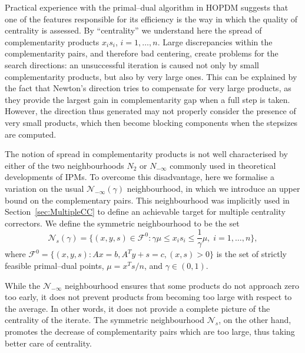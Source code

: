 
Practical experience with the primal--dual algorithm in HOPDM \cite{HOPDM}
suggests that one of the features responsible 
for its efficiency is the way in which the quality of centrality 
is assessed. By ``centrality'' we understand here the spread 
of complementarity products $x_i s_i$, $i = 1,\dots,n$.
Large discrepancies within the complementarity 
pairs, and therefore bad centering, create problems for the search 
directions: an unsuccessful iteration is caused not only by small
complementarity products, but also by very large ones.
%
 This can be explained by the fact that
Newton's direction tries to compensate for very 
large products, as they provide the largest gain in complementarity 
gap when a full step is taken. However, the direction thus generated 
may not properly consider the presence of very small products, 
which then become blocking components when the stepsizes are computed.

The notion of spread in complementarity products
is not well characterised by either 
of the two neighbourhoods $N_2$ or $N_{-\infty}$ commonly used 
in theoretical developments of IPMs.
To overcome this disadvantage, here we formalise a variation 
on the usual $\mathcal{N}_{-\infty}(\gamma)$ neighbourhood, 
in which we introduce an upper bound on the complementary pairs. 
This neighbourhood was implicitly used in Section~\ref{sec:MultipleCC}
to define an achievable target for multiple centrality correctors.
We define the symmetric neighbourhood to be the set
\[
  \mathcal{N}_s(\gamma)=\{(x,y,s)\in \mathcal{F}^0: 
  \gamma\mu\le x_is_i \le \frac{1}{\gamma}\mu, \; i=1,\ldots,n\},
\]
where $\mathcal{F}^0=\{(x,y,s) : Ax=b,A^Ty+s=c,(x,s)>0\}$ 
is the set of strictly feasible primal--dual points,
$\mu = x^Ts/n$, and $\gamma \in (0,1)$.

While the $\mathcal{N}_{-\infty}$ neighbourhood ensures that some 
products do not approach zero too early, it does not prevent products
from becoming too large with respect to the average.
In other words, it does not provide a complete 
picture of the centrality of the iterate. The symmetric 
neighbourhood $\mathcal{N}_s$, on the other hand, promotes 
the decrease of complementarity pairs which are too large, thus taking 
better care of centrality.

